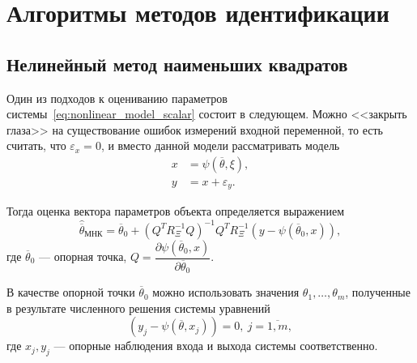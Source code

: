 \section{Алгоритмы методов идентификации}

\subsection{Нелинейный метод наименьших квадратов}

Один из подходов к оцениванию параметров системы~\eqref{eq:nonlinear_model_scalar}
состоит в следующем.
Можно <<закрыть глаза>> на существование ошибок измерений
входной переменной, то есть считать, что \( \varepsilon_x = 0 \),
и вместо данной модели рассматривать модель
\begin{equation*}
  \begin{aligned}
    x &= \psi(\overline{\theta}, \xi), \\
    y &= x + \varepsilon_y.
  \end{aligned}
\end{equation*}

Тогда оценка вектора параметров объекта определяется выражением~\cite{mukha_2009}
\begin{equation}
  \label{eq:nonlinear_lse}
  \hat{\overline{\theta}}_{\text{МНК}} =
  \overline{\theta}_0 + (Q^T R^{-1}_{\Xi} Q)^{-1} Q^T R^{-1}_{\Xi} (y - \psi(\overline{\theta}_0, x)),
\end{equation}
где \( \overline{\theta}_0 \) --- опорная точка,
\( Q = \dfrac{\partial \psi(\overline{\theta}_0, x) }{ \partial \overline{\theta}_0 } \).

В качестве опорной точки \( \overline{\theta}_0 \) можно использовать значения
\( \theta_1, \dotsc, \theta_m \),
полученные в результате численного решения системы уравнений
\begin{equation}
  \label{eq:nonlinear_basic}
  (y_j - \psi( \overline{\theta}, x_j )) = 0, \: j = \overline{1,m},
\end{equation}
где \( x_j, y_j \) --- опорные наблюдения входа и выхода системы соответственно.

